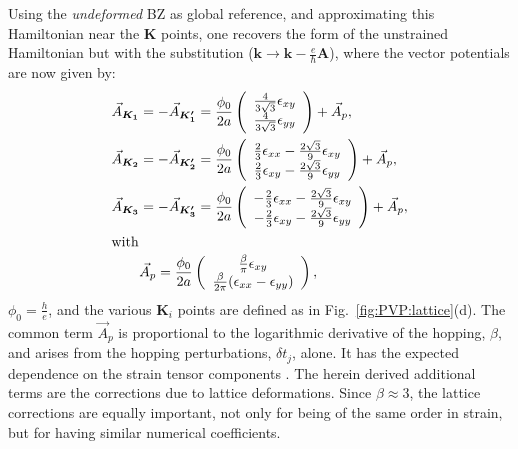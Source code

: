 Using the \emph{undeformed} BZ as global reference, and approximating this Hamiltonian near the $\bm{K}$ points, one recovers the form of the unstrained Hamiltonian but with the substitution ($\bm{k} \to \bm{k}-\frac{e}{\hbar} \bm{A}$), where the vector potentials are now given by:
\begin{subequations}\label{pvp-all}
\begin{align}
\vec{A}_{\bm{K_1}}&=-\vec{A}_{\bm{K_1'}}=\frac{\phi_0}{2a} \left( \begin{array}{c} \frac{4}{3\sqrt{3}}\epsilon_{xy}\\ \frac{4}{3 \sqrt{3}} \epsilon_{yy} \end{array} \right) +\vec{A}_p , \label{pvpK1}\\ 
\vec{A}_{\bm{K_2}}&=-\vec{A}_{\bm{K_2'}}=\frac{\phi_0}{2a} \left( \begin{array}{c} \frac{2}{3}\epsilon_{xx}-\frac{2\sqrt{3}}{9} \epsilon_{xy} \\ \frac{2}{3} \epsilon_{xy}-\frac{2 \sqrt{3}}{9} \epsilon_{yy} \end{array} \right)+\vec{A}_p  , \label{pvpK2} \\
\vec{A}_{\bm{K_3}}&=-\vec{A}_{\bm{K_3'}}=\frac{\phi_0}{2a} \left( \begin{array}{c} -\frac{2}{3} \epsilon_{xx}-\frac{2 \sqrt{3}}{9} \epsilon_{xy} \\ -\frac{2}{3} \epsilon_{xy}-\frac{2 \sqrt{3}}{9} \epsilon_{yy} \end{array} \right)+\vec{A}_p  , \label{pvpK3} \\
\intertext{with}
&\vec{A}_p=\frac{\phi_0}{2a} \left( \begin{array}{c} \frac{\beta }{\pi} \epsilon_{xy} \\ \frac{\beta }{2 \pi} (\epsilon_{xx}-\epsilon_{yy}) \end{array} \right),
\label{pvpe}
\end{align}
\end{subequations}
$\phi_0=\frac{h}{e}$, and the various $\bm{K}_i$ points are defined as in Fig.~\ref{fig:PVP:lattice}(d).
The common term $\vec{A}_p$ is proportional to the logarithmic derivative of the hopping, $\beta$, and arises from the hopping perturbations, $\delta t_j$, alone.
It has the expected dependence on the strain tensor components \cite{CastroNeto2009,Vozmediano2010}. 
The herein derived additional terms are the corrections due to lattice deformations.
Since $\beta \approx 3$, the lattice corrections are equally important, not only for being of the same order in strain, but for having similar numerical coefficients.
